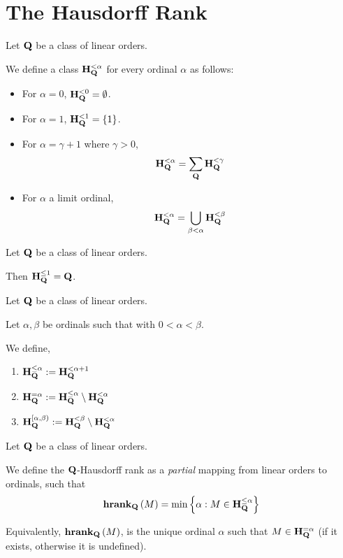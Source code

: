 \section{The Hausdorff Rank}

\begin{definition}
  Let $\mathbf{Q}$ be a class of linear orders.

  We define a class $\mathbf{H}_{\mathbf{Q}}^{< \alpha}$
  for every ordinal $\alpha$ as follows:

  \begin{itemize}
    \item For $\alpha = 0$, $\mathbf{H}_{\mathbf{Q}}^{< 0} = \emptyset$.
    \item For $\alpha = 1$, $\mathbf{H}_{\mathbf{Q}}^{< 1} = \left\{ {1} \right\}$.
    \item For $\alpha = \gamma + 1$ where $\gamma > 0$,
          \[\mathbf{H}_{\mathbf{Q}}^{< \alpha} = \sum_{\mathbf{Q}}{\mathbf{H}_{\mathbf{Q}}^{< \gamma}}\]
    \item For $\alpha$ a limit ordinal,
          \[\mathbf{H}_{\mathbf{Q}}^{< \alpha} = \bigcup_{\beta < \alpha} \mathbf{H}_{\mathbf{Q}}^{< \beta}\]
  \end{itemize}

\end{definition}

\begin{example}
  Let $\mathbf{Q}$ be a class of linear orders.

  Then $\mathbf{H}_{\mathbf{Q}}^{\le 1} = \mathbf{Q}$.
\end{example}

\begin{definition}
  Let $\mathbf{Q}$ be a class of linear orders.

  Let $\alpha, \beta$ be ordinals such that with $0 < \alpha < \beta$.

  We define,
  \begin{enumerate}
    \item $\mathbf{H}_{\mathbf{Q}}^{\le \alpha} := \mathbf{H}_{\mathbf{Q}}^{< \alpha + 1}$
    \item $\mathbf{H}_{\mathbf{Q}}^{= \alpha} := \mathbf{H}_{\mathbf{Q}}^{\le \alpha} \setminus \mathbf{H}_{\mathbf{Q}}^{< \alpha}$
    \item $\mathbf{H}_{\mathbf{Q}}^{[\alpha, \beta)} := \mathbf{H}_{\mathbf{Q}}^{< \beta} \setminus \mathbf{H}_{\mathbf{Q}}^{< \alpha}$
  \end{enumerate}
\end{definition}

\begin{definition}
  Let $\mathbf{Q}$ be a class of linear orders.

  We define the $\mathbf{Q}$-Hausdorff rank as a \emph{partial} mapping
  from linear orders to ordinals, such that
  \[
    \mathbf{hrank}_{\mathbf{Q}} \left( {M} \right) = \min \left\{ {\alpha : M \in \mathbf{H}_{\mathbf{Q}}^{\le \alpha}} \right\}
  \]

  Equivalently, $\mathbf{hrank}_{\mathbf{Q}} \left( {M} \right)$, is the unique ordinal $\alpha$ such that
  $M \in \mathbf{H}_{\mathbf{Q}}^{= \alpha}$ (if it exists, otherwise it is undefined).

\end{definition}


